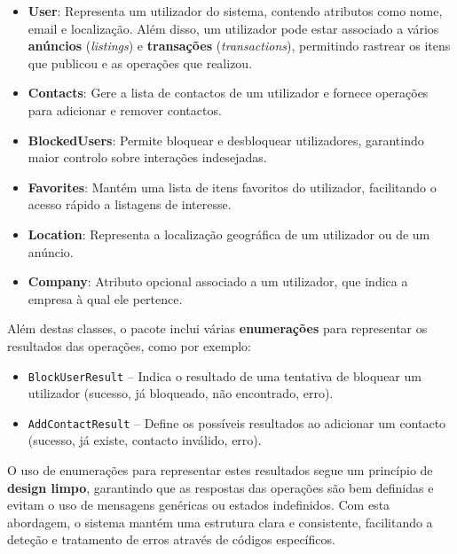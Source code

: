 \documentclass[a4paper, 12pt]{article} %
\begin{document}
\begin{itemize}
	\item \textbf{User}: Representa um utilizador do sistema, contendo atributos como nome, email e localização. Além disso, um utilizador pode estar associado a vários \textbf{anúncios} (\textit{listings}) e \textbf{transações} (\textit{transactions}), permitindo rastrear os itens que publicou e as operações que realizou.
	\item \textbf{Contacts}: Gere a lista de contactos de um utilizador e fornece operações para adicionar e remover contactos.
	\item \textbf{BlockedUsers}: Permite bloquear e desbloquear utilizadores, garantindo maior controlo sobre interações indesejadas.
	\item \textbf{Favorites}: Mantém uma lista de itens favoritos do utilizador, facilitando o acesso rápido a listagens de interesse.
	\item \textbf{Location}: Representa a localização geográfica de um utilizador ou de um anúncio.
	\item \textbf{Company}: Atributo opcional associado a um utilizador, que indica a empresa à qual ele pertence.
\end{itemize}

Além destas classes, o pacote inclui várias \textbf{enumerações} para representar os resultados das operações, como por exemplo:

\begin{itemize}
	\item \texttt{BlockUserResult} – Indica o resultado de uma tentativa de bloquear um utilizador (sucesso, já bloqueado, não encontrado, erro).
	\item \texttt{AddContactResult} – Define os possíveis resultados ao adicionar um contacto (sucesso, já existe, contacto inválido, erro).
\end{itemize}

O uso de enumerações para representar estes resultados segue um princípio de \textbf{design limpo}, garantindo que as respostas das operações são bem definidas e evitam o uso de mensagens genéricas ou estados indefinidos. Com esta abordagem, o sistema mantém uma estrutura clara e consistente, facilitando a deteção e tratamento de erros através de códigos específicos.

\end{document}
